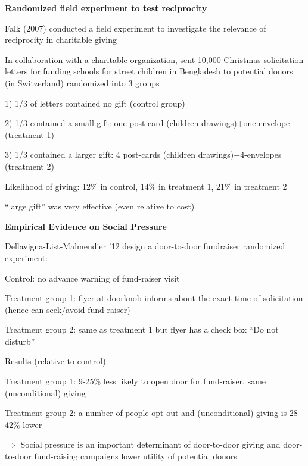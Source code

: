 \documentclass[landscape]{slides}
\begin{document}
\begin{slide}
\begin{center}
{\bf Randomized field experiment to test reciprocity}
\end{center}

Falk (2007) conducted a field experiment to investigate the relevance of reciprocity in charitable giving

In collaboration with a charitable organization, sent 10,000 Christmas solicitation letters for funding schools
for street children in Bengladesh to potential donors (in Switzerland) randomized into 3 groups

\small
1) 1/3 of letters contained no gift (control group)

2) 1/3 contained a small gift: one post-card (children drawings)+one-envelope (treatment 1)

3) 1/3 contained a larger gift: 4 post-cards (children drawings)+4-envelopes (treatment 2)
\normalsize

Likelihood of giving: 12\% in control, 14\% in treatment 1, 21\% in treatment 2

``large gift'' was very effective (even relative to cost)
\end{slide}

\begin{slide}
\begin{center}
{\bf Empirical Evidence on Social Pressure}
\end{center}
Dellavigna-List-Malmendier '12 design a door-to-door fundraiser randomized experiment:

\small
Control: no advance warning of fund-raiser visit
 
Treatment group 1: flyer at doorknob informs about the exact time of solicitation (hence can seek/avoid fund-raiser)

Treatment group 2: same as treatment 1 but flyer has a check box ``Do not disturb''

Results (relative to control):

Treatment group 1: 9-25\% less likely to open door for fund-raiser, same (unconditional) giving

Treatment group 2: a number of people opt out and (unconditional) giving is 28-42\% lower 

\normalsize

$\Rightarrow$ Social pressure is an important determinant of door-to-door giving and door-to-door
fund-raising campaigns lower utility of potential donors

\end{slide}
\end{document}
